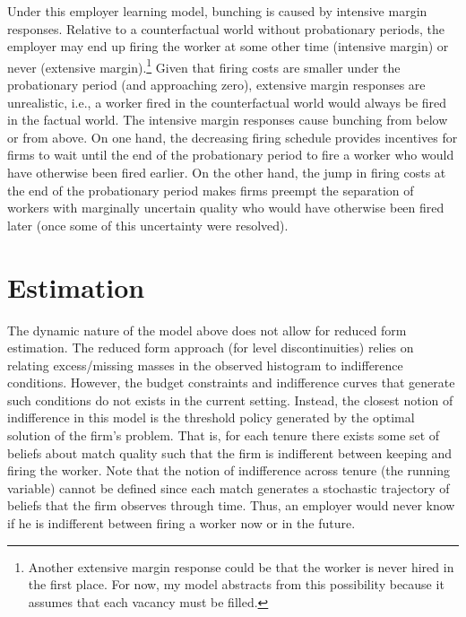 \documentclass[12pt]{article}
\begin{document}
Under this employer learning model, bunching is caused by intensive margin responses. 
Relative to a counterfactual world without probationary periods, the employer may end up firing the worker at some other time (intensive margin) or never (extensive margin).\footnote{
Another extensive margin response could be that the worker is never hired in the first place.
For now, my model abstracts from this possibility because it assumes that each vacancy must be filled.}
Given that firing costs are smaller under the probationary period (and approaching zero), extensive margin responses are unrealistic, i.e., a worker fired in the counterfactual world would always be fired in the factual world.
The intensive margin responses cause bunching from below or from above.
On one hand, the decreasing firing schedule provides incentives for firms to wait until the end of the probationary period to fire a worker who would have otherwise been fired earlier.
On the other hand, the jump in firing costs at the end of the probationary period makes firms preempt the separation of workers with marginally uncertain quality who would have otherwise been fired later (once some of this uncertainty were resolved).

\section{Estimation}

The dynamic nature of the model above does not allow for reduced form estimation.
The reduced form approach (for level discontinuities) relies on relating excess/missing masses in the observed histogram to indifference conditions.
However, the budget constraints and indifference curves that generate such conditions do not exists in the current setting.
Instead, the closest notion of indifference in this model is the threshold policy generated by the optimal solution of the firm's problem.
That is, for each tenure there exists some set of beliefs about match quality such that the firm is indifferent between keeping and firing the worker.
Note that the notion of indifference across tenure (the running variable) cannot be defined since each match generates a stochastic trajectory of beliefs that the firm observes through time.
Thus, an employer would never know if he is indifferent between firing a worker now or in the future.
\end{document}
